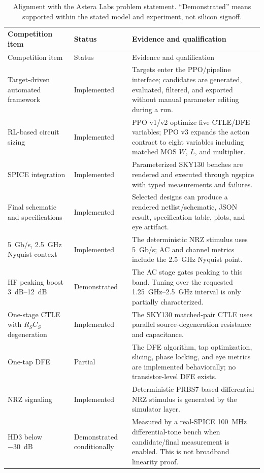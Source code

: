 \begin{longtable}{@{}p{}p{}p{}@{}}
\caption{Alignment with the Astera Labs problem statement. ``Demonstrated''
means supported within the stated model and experiment, not silicon signoff.}
\label{tab:competition-compliance}\\
\toprule
Competition item & Status & Evidence and qualification \\
\midrule
\endfirsthead
\toprule
Competition item & Status & Evidence and qualification \\
\midrule
\endhead
Target-driven automated framework & Implemented & Targets enter the PPO/pipeline interface; candidates are generated, evaluated, filtered, and exported without manual parameter editing during a run. \\
RL-based circuit sizing & Implemented & PPO v1/v2 optimize five CTLE/DFE variables; PPO v3 expands the action contract to eight variables including matched MOS $W$, $L$, and multiplier. \\
SPICE integration & Implemented & Parameterized SKY130 benches are rendered and executed through ngspice with typed measurements and failures. \\
Final schematic and specifications & Implemented & Selected designs can produce a rendered netlist/schematic, JSON result, specification table, plots, and eye artifact. \\
\SI{5}{Gb/s}, \SI{2.5}{GHz} Nyquist context & Implemented & The deterministic NRZ stimulus uses \SI{5}{Gb/s}; AC and channel metrics include the \SI{2.5}{GHz} Nyquist point. \\
HF peaking boost \SIrange{3}{12}{dB} & Demonstrated & The AC stage gates peaking to this band. Tuning over the requested \SIrange{1.25}{2.5}{GHz} interval is only partially characterized. \\
One-stage CTLE with $R_S C_S$ degeneration & Implemented & The SKY130 matched-pair CTLE uses parallel source-degeneration resistance and capacitance. \\
One-tap DFE & Partial & The DFE algorithm, tap optimization, slicing, phase locking, and eye metrics are implemented behaviorally; no transistor-level DFE exists. \\
NRZ signaling & Implemented & Deterministic PRBS7-based differential NRZ stimulus is generated by the simulator layer. \\
HD3 below \SI{-30}{dB} & Demonstrated conditionally & Measured by a real-SPICE \SI{100}{MHz} differential-tone bench when candidate/final measurement is enabled. This is not broadband linearity proof. \\

\end{longtable}

